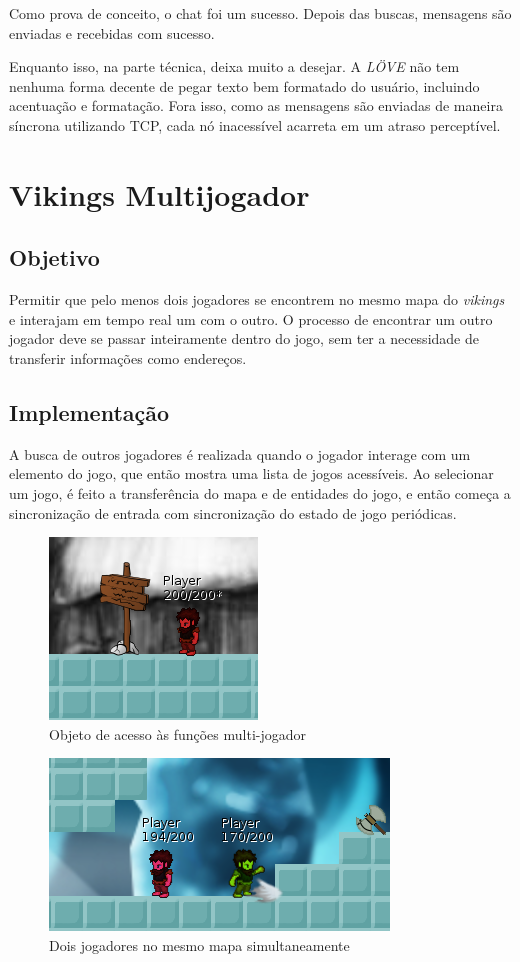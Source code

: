     Como prova de conceito, o chat foi um sucesso. Depois das buscas, mensagens são enviadas
    e recebidas com sucesso.
    
    Enquanto isso, na parte técnica, deixa muito a desejar. A \textit{LÖVE} não tem nenhuma
    forma decente de pegar texto bem formatado do usuário, incluindo acentuação e formatação.
    Fora isso, como as mensagens são enviadas de maneira síncrona utilizando TCP, cada nó
    inacessível acarreta em um atraso perceptível.
    
\section{Vikings Multijogador}
\label{sec:resultados:vikings}

  \subsection{Objetivo}
    Permitir que pelo menos dois jogadores se encontrem no mesmo mapa do \textit{vikings} e
    interajam em tempo real um com o outro. O processo de encontrar um outro jogador deve se
    passar inteiramente dentro do jogo, sem ter a necessidade de transferir informações como
    endereços.
    
  \subsection{Implementação}
    A busca de outros jogadores é realizada quando o jogador interage com um elemento do jogo,
    que então mostra uma lista de jogos acessíveis. Ao selecionar um jogo, é feito a transferência
    do mapa e de entidades do jogo, e então começa a sincronização de entrada com sincronização
    do estado de jogo periódicas.
    
    \begin{figure}[h]
      \centering
      \includegraphics{imagens/vikings-signpost.png}
      \caption{Objeto de acesso às funções multi-jogador}
    \end{figure}
    
    \begin{figure}[h]
      \centering
      \includegraphics{imagens/vikings-multiplayer.png}
      \caption{Dois jogadores no mesmo mapa simultaneamente}
    \end{figure}

